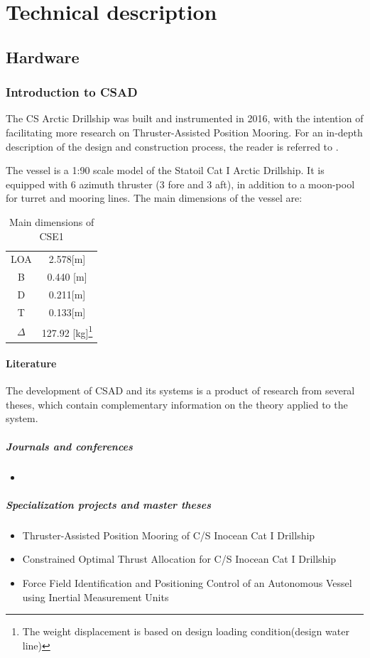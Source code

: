\part{Technical description}
\chapter{Hardware}
\section{Introduction to CSAD}
The CS Arctic Drillship was built and instrumented in 2016, with the intention of facilitating more research on Thruster-Assisted Position Mooring. For an in-depth description of the design and construction process, the reader is referred to \cite{bjorno2016thruster}. 

The vessel is a 1:90 scale model of the Statoil Cat I Arctic Drillship. It is equipped with 6 azimuth thruster (3 fore and 3 aft), in addition to a moon-pool for turret and mooring lines. The main dimensions of the vessel are:
\begin{table}[h!]
	\caption{Main dimensions of CSE1}
	\centering
	\begin{tabular}{cc}
		\hline
		LOA & 2.578[m]\\
		B & 0.440 [m]\\
		D & 0.211[m]\\
		T & 0.133[m]\\
		$\Delta$ & 127.92 [kg]\footnote{The weight displacement is based on design loading condition(design water line)}\\\hline
	\end{tabular}
\end{table}

\subsection{Literature}
The development of CSAD and its systems is a product of research from several theses, which contain complementary information on the theory applied to the system. 
\subsubsection{Journals and conferences}
\begin{itemize}
	\item 
\end{itemize}
\subsubsection{Specialization projects and master theses}
\begin{itemize}
	\item Thruster-Assisted Position Mooring of C/S Inocean Cat I Drillship \citep{bjorno2016thruster}
	\item Constrained Optimal Thrust Allocation for C/S Inocean Cat I Drillship \citep{frederich2016constrained}
	\item Force Field Identification and Positioning Control of an Autonomous Vessel using Inertial Measurement Units \citep{udjus2017}
\end{itemize}

